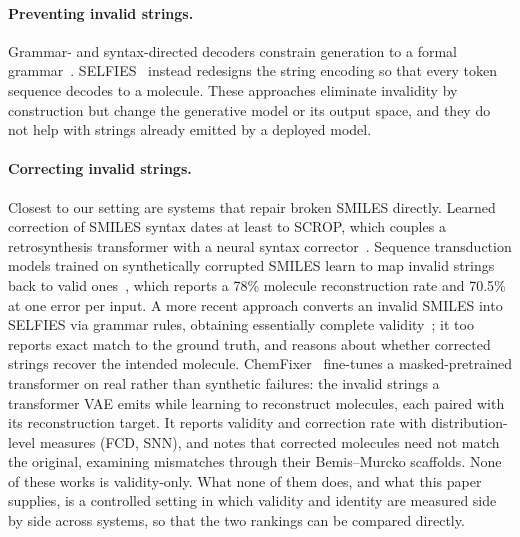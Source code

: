 \documentclass[11pt]{article}
\begin{document}
\paragraph{Preventing invalid strings.}
Grammar- and syntax-directed decoders constrain generation to a formal
grammar~\citep{kusner2017grammar,dai2018syntax,geng2023grammar}.
SELFIES~\citep{krenn2020selfies,krenn2022selfies} instead redesigns the string
encoding so that every token sequence decodes to a molecule. These approaches
eliminate invalidity by construction but change the generative model or its
output space, and they do not help with strings already emitted by a deployed
model.

\paragraph{Correcting invalid strings.}
Closest to our setting are systems that repair broken SMILES directly. Learned
correction of SMILES syntax dates at least to SCROP, which couples a
retrosynthesis transformer with a neural syntax corrector~\citep{zheng2020scrop}.
Sequence
transduction models trained on synthetically corrupted SMILES learn to map
invalid strings back to valid ones~\citep{schoenmaker2023uncorrupt}, which
reports a 78\% molecule reconstruction rate and 70.5\% at one error per input.
A more recent approach converts an invalid SMILES into SELFIES via grammar rules,
obtaining essentially complete validity~\citep{smiself2025}; it too reports exact
match to the ground truth, and reasons about whether corrected strings recover the
intended molecule. ChemFixer~\citep{park2026chemfixer} fine-tunes a
masked-pretrained transformer on real rather than synthetic failures: the invalid strings a transformer
VAE emits while learning to reconstruct molecules, each paired with its
reconstruction target. It reports validity and correction rate with
distribution-level measures (FCD, SNN), and notes that corrected molecules need
not match the original, examining mismatches through their Bemis--Murcko
scaffolds. None of these works is
validity-only. What none of them does, and what this
paper supplies, is a controlled setting in which validity and identity are measured
side by side across systems, so that the two rankings can be compared directly.
\end{document}
